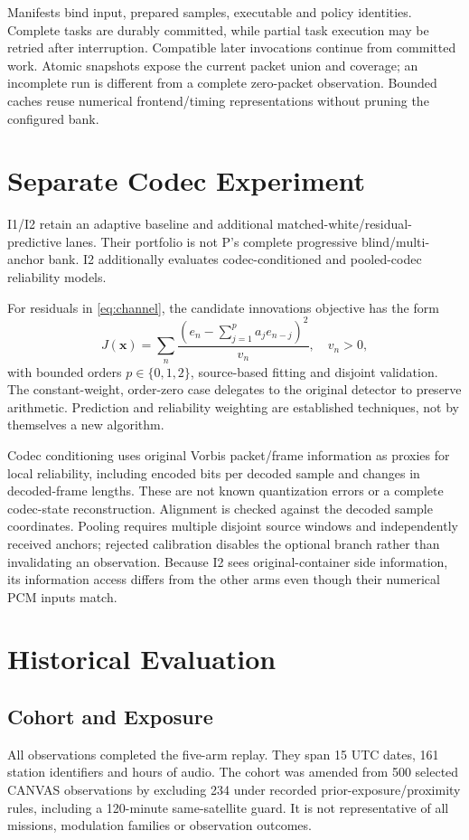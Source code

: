 \documentclass[journal]{IEEEtran}
\begin{document}
Manifests bind input, prepared samples, executable and policy identities. Complete tasks are durably committed, while partial task execution may be retried after interruption. Compatible later invocations continue from committed work. Atomic snapshots expose the current packet union and coverage; an incomplete run is different from a complete zero-packet observation. Bounded caches reuse numerical frontend/timing representations without pruning the configured bank.

\section{Separate Codec Experiment}
I1/I2 retain an adaptive baseline and additional matched-white/residual-predictive lanes. Their portfolio is not P's complete progressive blind/multi-anchor bank. I2 additionally evaluates codec-conditioned and pooled-codec reliability models.

For residuals in \eqref{eq:channel}, the candidate innovations objective has the form
\begin{equation}
J(\boldsymbol{x})=\sum_n\frac{\left(e_n-\sum_{j=1}^{p}a_je_{n-j}\right)^2}{v_n},
\quad v_n>0,
\label{eq:innovations}
\end{equation}
with bounded orders $p\in\{0,1,2\}$, source-based fitting and disjoint validation. The constant-weight, order-zero case delegates to the original detector to preserve arithmetic. Prediction and reliability weighting are established techniques, not by themselves a new algorithm.

Codec conditioning uses original Vorbis packet/frame information as proxies for local reliability, including encoded bits per decoded sample and changes in decoded-frame lengths. These are not known quantization errors or a complete codec-state reconstruction. Alignment is checked against the decoded sample coordinates. Pooling requires multiple disjoint source windows and independently received anchors; rejected calibration disables the optional branch rather than invalidating an observation. Because I2 sees original-container side information, its information access differs from the other arms even though their numerical PCM inputs match.

\section{Historical Evaluation}\label{sec:evaluation}
\subsection{Cohort and Exposure}
All \StudyN{} observations completed the five-arm replay. They span 15 UTC dates, 161 station identifiers and \AudioHours{} hours of audio. The cohort was amended from 500 selected CANVAS observations by excluding 234 under recorded prior-exposure/proximity rules, including a 120-minute same-satellite guard. It is not representative of all missions, modulation families or observation outcomes.
\end{document}
